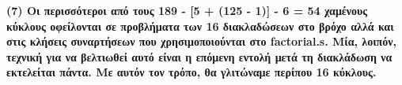 \documentclass{article}
\begin{document}
\textbf{(7) \hspace{0.1cm} Οι περισσότεροι από τους 189 - [5 + (125 - 1)] - 6 = 54 χαμένους κύκλους οφείλονται σε προβλήματα των 16 διακλαδώσεων στο βρόχο αλλά και στις κλήσεις συναρτήσεων που χρησιμοποιούνται στο \textlatin{factorial.s}. Μία, λοιπόν, τεχνική για να βελτιωθεί αυτό είναι η επόμενη εντολή μετά τη διακλάδωση να εκτελείται πάντα. Με αυτόν τον τρόπο, θα γλιτώναμε περίπου 16 κύκλους.}


\vspace{7.1cm}
\hline




\newpage

\begin{center}
    \vspace*{\fill}
    \setlength{\fboxrule}{1.1pt}
    \setlength{\fboxsep}{7pt}
    \vspace*{\fill}
\end{center}


\end{document}
